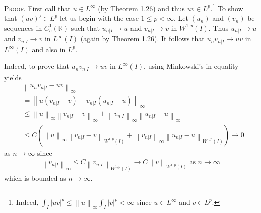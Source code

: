 \documentclass[a4paper,oneside]{book}
\numberwithin{equation}{chapter}
\begin{document}
\textsc{Proof.} First call that $u\in L^{\infty}$ (by Theorem 1.26) and thus $uv\in L^p$.\footnote{Indeed, $\int_I {{{\left| {uv} \right|}^p}}  \le {\left\| u \right\|_\infty }\int_I {{{\left| v \right|}^p}}  < \infty $ since $u\in L^{\infty}$ and $v\in L^p$.} To show that $\left(uv\right)'\in L^p$ let us begin with the case $1\le p<\infty$. Let $\left(u_n\right)$ and $\left(v_n\right)$ be sequences in $C_c^1\left(\mathbb{R}\right)$ such that ${u_{\left. n \right|I}} \to u$ and ${v_{\left. n \right|I}} \to v$ in $W^{1,p}\left(I\right)$. Thus ${u_{\left. n \right|I}} \to u$ and ${v_{\left. n \right|I}} \to v$ in $L^{\infty}\left(I\right)$ (again by Theorem 1.26). It follows that ${u_n}{v_{\left. n \right|I}} \to uv$ in $L^{\infty}\left(I\right)$ and also in $L^p$. 

Indeed, to prove that ${u_n}{v_{\left. n \right|I}} \to uv$ in $L^{\infty}\left(I\right)$, using Minkowski's in equality yields
\begin{align}
&{\left\| {{u_n}{v_{\left. n \right|I}} - uv} \right\|_\infty } \\
&= {\left\| {u\left( {{v_{\left. n \right|I}} - v} \right) + {v_{\left. n \right|I}}\left( {{u_{\left. n \right|I}} - u} \right)} \right\|_\infty }\\
 &\le {\left\| u \right\|_\infty }{\left\| {{v_{\left. n \right|I}} - v} \right\|_\infty } + {\left\| {{v_{\left. n \right|I}}} \right\|_\infty }{\left\| {{u_{\left. n \right|I}} - u} \right\|_\infty }\\
 &\le C\left( {{{\left\| u \right\|}_\infty }{{\left\| {{v_{\left. n \right|I}} - v} \right\|}_{{W^{1,p}}\left( I \right)}} + {{\left\| {{v_{\left. n \right|I}}} \right\|}_\infty }{{\left\| {{u_{\left. n \right|I}} - u} \right\|}_{{W^{1,p}}\left( I \right)}}} \right) \to 0
\end{align}
as $n \to \infty $ since 
\begin{align}
\label{1.345}
{\left\| {{v_{\left. n \right|I}}} \right\|_\infty } \le C{\left\| {{v_{\left. n \right|I}}} \right\|_{{W^{1,p}}\left( I \right)}} \to C{\left\| v \right\|_{{W^{1,p}}\left( I \right)}}\mbox{ as } n \to \infty 
\end{align}
which is bounded as $n \to \infty $. 
\end{document}
